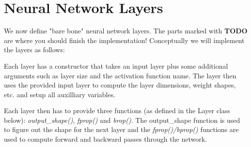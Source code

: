 \documentclass[11pt]{article}
\begin{document}
    \section{Neural Network Layers}\label{neural-network-layers}

We now define "bare bone" neural network layers. The parts marked with
\textbf{TODO} are where you should finish the implementation!
Conceptually we will implement the layers as follows:

Each layer has a constructor that takes an input layer plus some
additional arguments such as layer size and the activation function
name. The layer then uses the provided input layer to compute the layer
dimensions, weight shapes, etc. and setup all auxilliary variables.

Each layer then has to provide three functions (as defined in the Layer
class below): \emph{output\_shape()}, \emph{fprop()} and \emph{brop()}.
The output\_shape function is used to figure out the shape for the next
layer and the \emph{fprop()/bprop()} functions are used to compute
forward and backward passes through the network.
\end{document}
